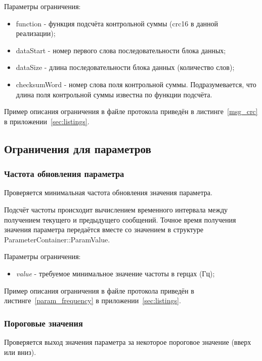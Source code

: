 Параметры ограничения:

\begin{itemize}
 \item function - функция подсчёта контрольной суммы (crc16 в данной 
реализации);
 \item dataStart - номер первого слова последовательности блока данных;
 \item dataSize - длина последовательности блока данных (количество слов);
 \item checksumWord - номер слова поля контрольной суммы. 
Подразумевается, что длина поля контрольной суммы известна по функции подсчёта.
\end{itemize}

Пример описания ограничения в файле протокола приведён в 
листинге~\ref{msg_crc} в приложении~\ref{sec:listings}.

\subsection{Ограничения для параметров}
\label{subsec:param_restricts}

\subsubsection{Частота обновления параметра}

Проверяется минимальная частота обновления значения параметра.

Подсчёт частоты происходит вычислением временного интервала между получением 
текущего и предыдущего сообщений. Точное время получения значения
параметра передаётся вместе со значением в структуре 
ParameterContainer::ParamValue.

Параметры ограничения:

\begin{itemize}
 \item \textit{value} - требуемое минимальное значение частоты в герцах (Гц);
\end{itemize}

Пример описания ограничения в файле протокола приведён в 
листинге~\ref{param_frequency} в приложении~\ref{sec:listings}.

\subsubsection{Пороговые значения}

Проверяется выход значения параметра за некоторое пороговое значение (вверх или 
вниз).

